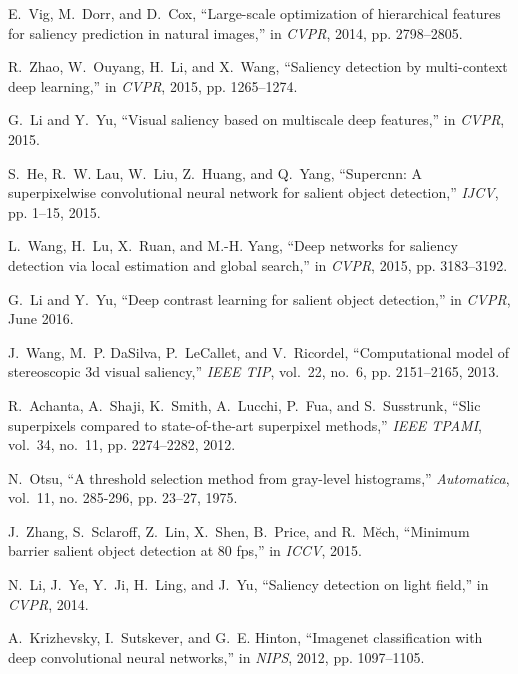 \documentclass[journal]{IEEEtran}
\begin{document}
\begin{thebibliography}{10}
E.~Vig, M.~Dorr, and D.~Cox, ``Large-scale optimization of hierarchical
  features for saliency prediction in natural images,'' in \emph{CVPR}, 2014,
  pp. 2798--2805.

R.~Zhao, W.~Ouyang, H.~Li, and X.~Wang, ``Saliency detection by multi-context
  deep learning,'' in \emph{CVPR}, 2015, pp. 1265--1274.

G.~Li and Y.~Yu, ``Visual saliency based on multiscale deep features,'' in
  \emph{CVPR}, 2015.

S.~He, R.~W. Lau, W.~Liu, Z.~Huang, and Q.~Yang, ``Supercnn: A superpixelwise
  convolutional neural network for salient object detection,'' \emph{IJCV}, pp.
  1--15, 2015.

L.~Wang, H.~Lu, X.~Ruan, and M.-H. Yang, ``Deep networks for saliency detection
  via local estimation and global search,'' in \emph{CVPR}, 2015, pp.
  3183--3192.

G.~Li and Y.~Yu, ``Deep contrast learning for salient object detection,'' in
  \emph{CVPR}, June 2016.

J.~Wang, M.~P. DaSilva, P.~LeCallet, and V.~Ricordel, ``Computational model of
  stereoscopic 3d visual saliency,'' \emph{IEEE TIP}, vol.~22, no.~6, pp.
  2151--2165, 2013.

R.~Achanta, A.~Shaji, K.~Smith, A.~Lucchi, P.~Fua, and S.~Susstrunk, ``Slic
  superpixels compared to state-of-the-art superpixel methods,'' \emph{IEEE
  TPAMI}, vol.~34, no.~11, pp. 2274--2282, 2012.

N.~Otsu, ``A threshold selection method from gray-level histograms,''
  \emph{Automatica}, vol.~11, no. 285-296, pp. 23--27, 1975.

J.~Zhang, S.~Sclaroff, Z.~Lin, X.~Shen, B.~Price, and R.~M\u{e}ch, ``Minimum
  barrier salient object detection at 80 fps,'' in \emph{ICCV}, 2015.

N.~Li, J.~Ye, Y.~Ji, H.~Ling, and J.~Yu, ``Saliency detection on light field,''
  in \emph{CVPR}, 2014.

A.~Krizhevsky, I.~Sutskever, and G.~E. Hinton, ``Imagenet classification with
  deep convolutional neural networks,'' in \emph{NIPS}, 2012, pp. 1097--1105.

\end{thebibliography}
\end{document}
